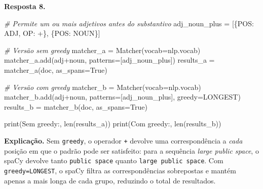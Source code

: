 \documentclass[
  brazilian,
]{article}
\newenvironment{Shaded}{}{}
\newcommand{\BuiltInTok}[1]{#1}
\newcommand{\CommentTok}[1]{\textcolor[rgb]{0.38,0.63,0.69}{\textit{#1}}}
\newcommand{\NormalTok}[1]{#1}
\newcommand{\OperatorTok}[1]{\textcolor[rgb]{0.40,0.40,0.40}{#1}}
\newcommand{\StringTok}[1]{\textcolor[rgb]{0.25,0.44,0.63}{#1}}
\newcommand{\VariableTok}[1]{\textcolor[rgb]{0.10,0.09,0.49}{#1}}
\begin{document}
\textbf{Resposta 8.}

\begin{Shaded}
\begin{Highlighting}[]
\CommentTok{\# Permite um ou mais adjetivos antes do substantivo}
\NormalTok{adj\_noun\_plus }\OperatorTok{=}\NormalTok{ [\{}\StringTok{\textquotesingle{}POS\textquotesingle{}}\NormalTok{: }\StringTok{\textquotesingle{}ADJ\textquotesingle{}}\NormalTok{, }\StringTok{\textquotesingle{}OP\textquotesingle{}}\NormalTok{: }\StringTok{\textquotesingle{}+\textquotesingle{}}\NormalTok{\}, \{}\StringTok{\textquotesingle{}POS\textquotesingle{}}\NormalTok{: }\StringTok{\textquotesingle{}NOUN\textquotesingle{}}\NormalTok{\}]}

\CommentTok{\# Versão sem \textquotesingle{}greedy\textquotesingle{}}
\NormalTok{matcher\_a }\OperatorTok{=}\NormalTok{ Matcher(vocab}\OperatorTok{=}\NormalTok{nlp.vocab)}
\NormalTok{matcher\_a.add(}\StringTok{\textquotesingle{}adj+noun\textquotesingle{}}\NormalTok{, patterns}\OperatorTok{=}\NormalTok{[adj\_noun\_plus])}
\NormalTok{results\_a }\OperatorTok{=}\NormalTok{ matcher\_a(doc, as\_spans}\OperatorTok{=}\VariableTok{True}\NormalTok{)}

\CommentTok{\# Versão com \textquotesingle{}greedy\textquotesingle{}}
\NormalTok{matcher\_b }\OperatorTok{=}\NormalTok{ Matcher(vocab}\OperatorTok{=}\NormalTok{nlp.vocab)}
\NormalTok{matcher\_b.add(}\StringTok{\textquotesingle{}adj+noun\textquotesingle{}}\NormalTok{, patterns}\OperatorTok{=}\NormalTok{[adj\_noun\_plus], greedy}\OperatorTok{=}\StringTok{\textquotesingle{}LONGEST\textquotesingle{}}\NormalTok{)}
\NormalTok{results\_b }\OperatorTok{=}\NormalTok{ matcher\_b(doc, as\_spans}\OperatorTok{=}\VariableTok{True}\NormalTok{)}

\BuiltInTok{print}\NormalTok{(}\StringTok{\textquotesingle{}Sem greedy:\textquotesingle{}}\NormalTok{, }\BuiltInTok{len}\NormalTok{(results\_a))}
\BuiltInTok{print}\NormalTok{(}\StringTok{\textquotesingle{}Com greedy:\textquotesingle{}}\NormalTok{, }\BuiltInTok{len}\NormalTok{(results\_b))}
\end{Highlighting}
\end{Shaded}

\textbf{Explicação.} Sem \texttt{greedy}, o operador \texttt{+} devolve
uma correspondência a \emph{cada} posição em que o padrão pode ser
satisfeito: para a sequência \emph{large public space}, o spaCy devolve
tanto \texttt{public\ space} quanto \texttt{large\ public\ space}. Com
\texttt{greedy=\textquotesingle{}LONGEST\textquotesingle{}}, o spaCy
filtra as correspondências sobrepostas e mantém apenas a mais longa de
cada grupo, reduzindo o total de resultados.
\end{document}
